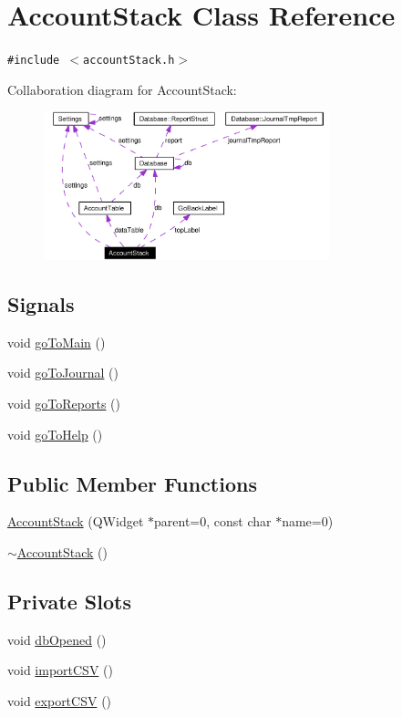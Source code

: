 \hypertarget{classAccountStack}{
\section{Account\-Stack Class Reference}
\label{classAccountStack}
}
{\tt \#include $<$account\-Stack.h$>$}

Collaboration diagram for Account\-Stack:\begin{figure}[H]
\begin{center}
\leavevmode
\includegraphics[width=235pt]{classAccountStack__coll__graph}
\end{center}
\end{figure}
\subsection*{Signals}
\begin{CompactItemize}
\item 
void \hyperlink{classAccountStack_l0}{go\-To\-Main} ()
\item 
void \hyperlink{classAccountStack_l1}{go\-To\-Journal} ()
\item 
void \hyperlink{classAccountStack_l2}{go\-To\-Reports} ()
\item 
void \hyperlink{classAccountStack_l3}{go\-To\-Help} ()
\end{CompactItemize}
\subsection*{Public Member Functions}
\begin{CompactItemize}
\item 
\hyperlink{classAccountStack_a0}{Account\-Stack} (QWidget $\ast$parent=0, const char $\ast$name=0)
\item 
\hyperlink{classAccountStack_a1}{$\sim$Account\-Stack} ()
\end{CompactItemize}
\subsection*{Private Slots}
\begin{CompactItemize}
\item 
void \hyperlink{classAccountStack_k0}{db\-Opened} ()
\item 
void \hyperlink{classAccountStack_k1}{import\-CSV} ()
\item 
void \hyperlink{classAccountStack_k2}{export\-CSV} ()
\end{CompactItemize}

